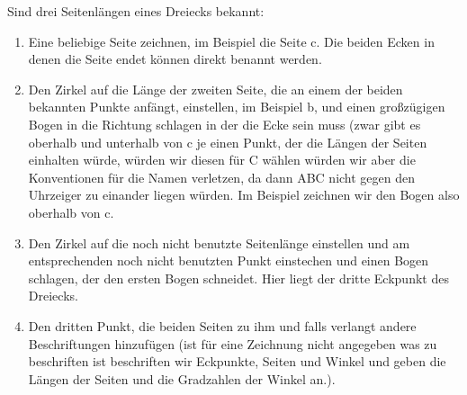 \documentclass[a4paper]{book}%
\theoremstyle{definition}
\begin{document}
Sind drei Seitenlängen eines Dreiecks bekannt:
\begin{enumerate}
  \item Eine beliebige Seite zeichnen, im Beispiel die Seite c. Die beiden Ecken in denen die Seite endet können direkt benannt werden.
  \item Den Zirkel auf die Länge der zweiten Seite, die an einem der beiden bekannten Punkte anfängt, einstellen, im Beispiel b, und einen großzügigen Bogen in die Richtung schlagen in der die Ecke sein muss (zwar gibt es oberhalb und unterhalb von c je einen Punkt, der die Längen der Seiten einhalten würde, würden wir diesen für C wählen würden wir aber die Konventionen für die Namen verletzen, da dann ABC nicht gegen den Uhrzeiger zu einander liegen würden. Im Beispiel zeichnen wir den Bogen also oberhalb von c.
  \item Den Zirkel auf die noch nicht benutzte Seitenlänge einstellen und am entsprechenden noch nicht benutzten Punkt einstechen und einen Bogen schlagen, der den ersten Bogen schneidet. Hier liegt der dritte Eckpunkt des Dreiecks.
  \item Den dritten Punkt, die beiden Seiten zu ihm und falls verlangt andere Beschriftungen hinzufügen (ist für eine Zeichnung nicht angegeben was zu beschriften ist beschriften wir Eckpunkte, Seiten und Winkel und geben die Längen der Seiten und die Gradzahlen der Winkel an.).
\end{enumerate}
\end{document}
